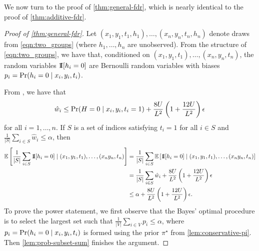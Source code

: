 We now turn to the proof of \cref{thm:general-fdr}, which is nearly identical to the proof of \cref{thm:additive-fdr}.

\begin{proof}[Proof of \cref{thm:general-fdr}]
Let $(x_1, y_1, t_1, h_1), \ldots, (x_n, y_n, t_n, h_n)$ denote draws from \cref{eqn:two_groups} (where $h_1,\ldots, h_n$ are unobserved). From the structure of \cref{eqn:two_groups}, we have that, conditioned on $(x_1, y_1, t_1), \ldots, (x_n, y_n, t_n)$, the random variables $\operatorname*{1{\hskip -2.5 pt}\hbox{I}}[h_i = 0]$ are Bernoulli random variables with biases $p_i = \textnormal{Pr}(h_i = 0 \mid x_i, y_i, t_i)$.

From , we have that
\[\hat{w}_i \leq \textnormal{Pr}(H=0 \mid x_i, y_i, t_i=1) + \frac{8U}{L^2} \left( 1 + \frac{12U}{L^2}\right) \epsilon \]
for all $i=1,\ldots, n$. If $S$ is a set of indices satisfying $t_i=1$ for all $i \in S$ and $\frac{1}{|S|} \sum_{i\in S} \hat{w}_i \leq \alpha$, then
\begin{align*}
\mathbb{E} \left[ \frac{1}{|S|} \sum_{i \in S} \operatorname*{1{\hskip -2.5 pt}\hbox{I}}[h_i = 0] \mid (x_1, y_1, t_1), \ldots, (x_n y_n, t_n) \right] 
&= \frac{1}{|S|} \sum_{i \in S} \mathbb{E}\left[ \operatorname*{1{\hskip -2.5 pt}\hbox{I}}[h_i = 0] \mid (x_1, y_1, t_1), \ldots, (x_n y_n, t_n) \right] \\
&=  \frac{1}{|S|} \sum_{i \in 
S} \hat{w}_i + \frac{8U}{L^2} \left( 1 + \frac{12U}{L^2}\right) \epsilon \\
&\leq \alpha + \frac{8U}{L^2} \left( 1 + \frac{12U}{L^2}\right)\epsilon.
\end{align*}
To prove the power statement, we first observe that the Bayes' optimal procedure is to select the largest set such that $\frac{1}{|V|} \sum_{i\in V} p_i \leq \alpha$, where $p_i = \textnormal{Pr}(h_i = 0 \mid x_i, y_i, t_i)$ is formed using the prior $\pi^\star$ from \cref{lem:conservative-pi}. Then \cref{lem:prob-subset-sum} finishes the argument.
\end{proof}